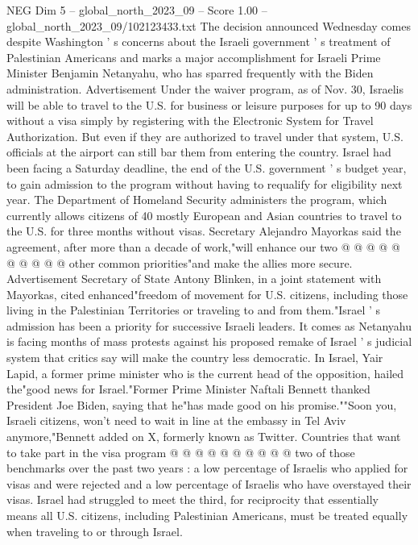 \begin{textsample}{NEG Dim 5 – global\_north\_2023\_09 – Score 1.00 – global\_north\_2023\_09/102123433.txt}  \label{ex:f5_neg_014}
The decision announced Wednesday comes despite Washington ' s concerns about the Israeli government ' s treatment of Palestinian Americans and marks a major accomplishment for Israeli Prime Minister Benjamin Netanyahu, who has sparred frequently with the Biden administration.
Advertisement Under the waiver program, as of Nov. 30, Israelis will be able to travel to the U.S. for business or leisure purposes for up to 90 days without a visa simply by registering with the Electronic System for Travel Authorization.
But even if they are authorized to travel under that system, U.S. officials at the airport can still bar them from entering the country.
Israel had been facing a Saturday deadline, the end of the U.S. government ' s budget year, to gain admission to the program without having to requalify for eligibility next year.
The Department of Homeland Security administers the program, which currently allows citizens of 40 mostly European and Asian countries to travel to the U.S. for three months without visas.
Secretary Alejandro Mayorkas said the agreement, after more than a decade of work,"will enhance our two @ @ @ @ @ @ @ @ @ @ other common priorities"and make the allies more secure.
Advertisement Secretary of State Antony Blinken, in a joint statement with Mayorkas, cited enhanced"freedom of movement for U.S. citizens, including those living in the Palestinian Territories or traveling to and from them."Israel ' s admission has been a priority for successive Israeli leaders.
It comes as Netanyahu is facing months of mass protests against his proposed remake of Israel ' s judicial system that critics say will make the country less democratic.
In Israel, Yair Lapid, a former prime minister who is the current head of the opposition, hailed the"good news for Israel."Former Prime Minister Naftali Bennett thanked President Joe Biden, saying that he"has made good on his promise.""Soon you, Israeli citizens, won't need to wait in line at the embassy in Tel Aviv anymore,"Bennett added on X, formerly known as Twitter.
Countries that want to take part in the visa program @ @ @ @ @ @ @ @ @ @ two of those benchmarks over the past two years : a low percentage of Israelis who applied for visas and were rejected and a low percentage of Israelis who have overstayed their visas.
Israel had struggled to meet the third, for reciprocity that essentially means all U.S. citizens, including Palestinian Americans, must be treated equally when traveling to or through Israel.

\end{textsample}
